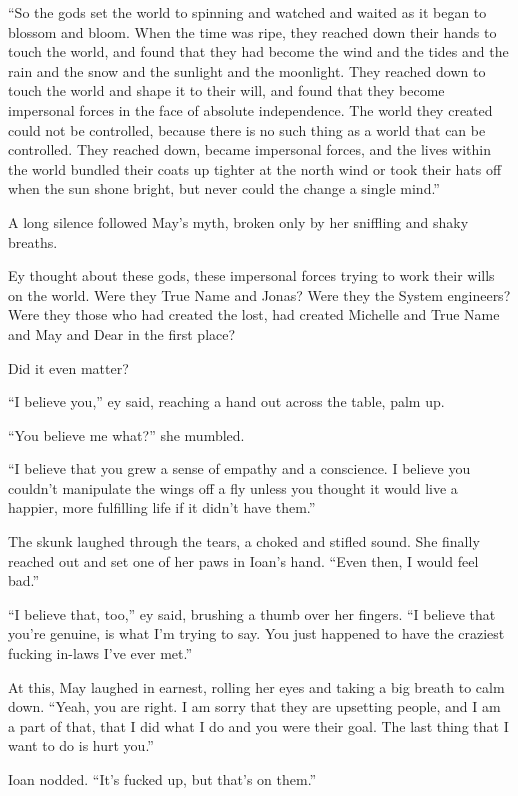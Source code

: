 ``So the gods set the world to spinning and watched and waited as it began to blossom and bloom. When the time was ripe, they reached down their hands to touch the world, and found that they had become the wind and the tides and the rain and the snow and the sunlight and the moonlight. They reached down to touch the world and shape it to their will, and found that they become impersonal forces in the face of absolute independence. The world they created could not be controlled, because there is no such thing as a world that can be controlled. They reached down, became impersonal forces, and the lives within the world bundled their coats up tighter at the north wind or took their hats off when the sun shone bright, but never could the change a single mind.''

A long silence followed May's myth, broken only by her sniffling and shaky breaths.

Ey thought about these gods, these impersonal forces trying to work their wills on the world. Were they True Name and Jonas? Were they the System engineers? Were they those who had created the lost, had created Michelle and True Name and May and Dear in the first place?

Did it even matter?

``I believe you,'' ey said, reaching a hand out across the table, palm up.

``You believe me what?'' she mumbled.

``I believe that you grew a sense of empathy and a conscience. I believe you couldn't manipulate the wings off a fly unless you thought it would live a happier, more fulfilling life if it didn't have them.''

The skunk laughed through the tears, a choked and stifled sound. She finally reached out and set one of her paws in Ioan's hand. ``Even then, I would feel bad.''

``I believe that, too,'' ey said, brushing a thumb over her fingers. ``I believe that you're genuine, is what I'm trying to say. You just happened to have the craziest fucking in-laws I've ever met.''

At this, May laughed in earnest, rolling her eyes and taking a big breath to calm down. ``Yeah, you are right. I am sorry that they are upsetting people, and I am a part of that, that I did what I do and you were their goal. The last thing that I want to do is hurt you.''

Ioan nodded. ``It's fucked up, but that's on them.''

